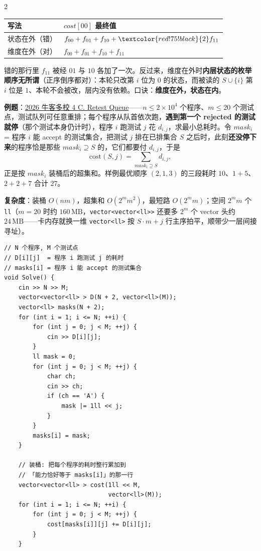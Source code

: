 \begin{multicols*}{2}
		\begin{center}
		\begin{tabular}{l|l}
			写法 & $cost[00]$ 最终值 \\ \hline
			\textcolor{red!75!black}{状态在外（错）} & $f_{00}+f_{01}+f_{10}+\textcolor{red!75!black}{2}f_{11}$ \\
			维度在外（对） & $f_{00}+f_{01}+f_{10}+f_{11}$ \\
		\end{tabular}
		\end{center}

		错的那行里 $f_{11}$ 被经 $01$ 与 $10$ 各加了一次。反过来，维度在外时\textbf{内层状态的枚举顺序无所谓}（正序倒序都对）：本轮只改第 $i$ 位为 $0$ 的状态，而被读的 $S \cup \{i\}$ 第 $i$ 位是 $1$、本轮不会被改，层内没有依赖。口诀：\textbf{维度在外，状态在内}。

		\textbf{例题}：\href{https://ac.nowcoder.com/acm/contest/133879/C}{2026 牛客多校 4 C. Retest Queue}——$n \le 2\times 10^4$ 个程序、$m \le 20$ 个测试点，测试队列可任意重排；每个程序从队首依次跑，\textbf{遇到第一个 rejected 的测试就停}（那个测试本身仍计时），程序 $i$ 跑测试 $j$ 花 $d_{i,j}$，求最小总耗时。令 $mask_i$ = 程序 $i$ 能 accept 的测试集合，把测试 $j$ 排在已排集合 $S$ 之后时，此刻\textbf{还没停下来}的程序恰是那些 $mask_i \supseteq S$ 的，它们都要付 $d_{i,j}$，于是
		$$\mathrm{cost}(S, j) = \sum_{mask_i \supseteq S} d_{i,j},$$
		正是按 $mask_i$ 装桶后的超集和。样例最优顺序 $(2,1,3)$ 的三段耗时 $10$、$1+5$、$2+2+7$ 合计 $27$。

		\textbf{复杂度}：装桶 $O(nm)$，超集和 $O(2^m m^2)$，最短路 $O(2^m m)$；空间 $2^m m$ 个 \verb|ll|（$m = 20$ 时约 $160\,\mathrm{MB}$，\verb|vector<vector<ll>>| 还要多 $2^m$ 个 vector 头约 $24\,\mathrm{MB}$——卡内存就换一维 \verb|vector<ll>| 按 $S \cdot m + j$ 行主序拍平，顺带少一层间接寻址）。

		\begin{verbatim}
// N 个程序, M 个测试点
// D[i][j]  = 程序 i 跑测试 j 的耗时
// masks[i] = 程序 i 能 accept 的测试集合
void Solve() {
	cin >> N >> M;
	vector<vector<ll> > D(N + 2, vector<ll>(M));
	vector<ll> masks(N + 2);
	for (int i = 1; i <= N; ++i) {
		for (int j = 0; j < M; ++j) {
			cin >> D[i][j];
		}
		ll mask = 0;
		for (int j = 0; j < M; ++j) {
			char ch;
			cin >> ch;
			if (ch == 'A') {
				mask |= 1ll << j;
			}
		}
		masks[i] = mask;
	}

	// 装桶: 把每个程序的耗时整行累加到
	// 「能力恰好等于 masks[i]」的那一行
	vector<vector<ll> > cost(1ll << M,
	                         vector<ll>(M));
	for (int i = 1; i <= N; ++i) {
		for (int j = 0; j < M; ++j) {
			cost[masks[i]][j] += D[i][j];
		}
	}


\end{verbatim}
\end{multicols*}
